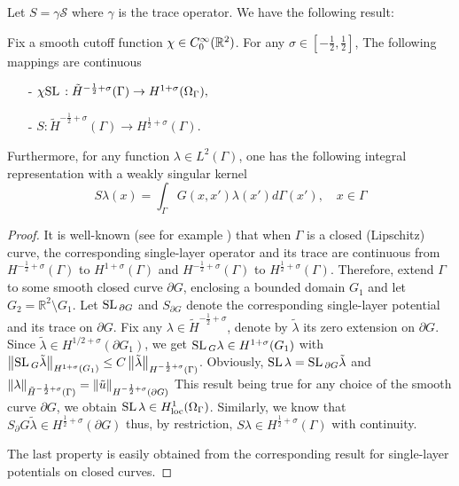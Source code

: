 \documentclass[10pt,a4paper]{article}
\begin{document}
Let $S = \gamma \mathcal S$ where $\gamma$ is the trace operator. We have the following result: 
\begin{The}
	\label{TheoSopenArc}
	Fix a smooth cutoff function $\chi \in C^{\infty}_{0}(\mathbb{R}^2)$. For any $\sigma \in [-\frac{1}{2}, \frac{1}{2}]$, The following mappings are continuous
	\begin{enumerate}
		\item[-] $\chi\mathcal {\textup{SL}\hspace{1.5pt}} : \tilde{H}^{-\frac{1}{2} + \sigma}(\Gamma) \to H^{1+ \sigma}(\Omega_\Gamma),$
		\item[-] $S : \tilde{H}^{-\frac{1}{2} + \sigma}(\Gamma) \to H^{\frac{1}{2}+ \sigma}(\Gamma).$
	\end{enumerate}
	Furthermore, for any function $\lambda \in L^{2}(\Gamma)$, one has the following integral representation with a weakly singular kernel
	\begin{equation}
		S\lambda(x) = \int_{\Gamma} G(x,x') \lambda(x') d\Gamma(x'), \quad x \in \Gamma		
	\end{equation}
	\begin{proof}
		It is well-known (see for example \cite[chap. 6]{mclean2000strongly}) that when $\Gamma$ is a closed (Lipschitz) curve, the corresponding single-layer operator and its trace are continuous from $H^{-\frac{1}{2}+ \sigma}(\Gamma)$ to $H^{1+\sigma}(\Gamma)$ and $H^{-\frac{1}{2}+ \sigma}(\Gamma)$ to $H^{
		\frac{1}{2}+\sigma}(\Gamma)$. Therefore, extend $\Gamma$ to some smooth closed curve $\partial G$, enclosing a bounded domain $G_1$ and let $G_2 = \mathbb{R}^2\setminus G_1$. Let $\textup{SL}\hspace{1.5pt}_{\partial G}$ and $S_{\partial G}$ denote the corresponding single-layer potential and its trace on $\partial G$. Fix any $\lambda \in \tilde{H}^{-\frac{1}{2} + \sigma}$, denote by $\tilde{\lambda}$ its zero extension on $\partial G$. Since $\tilde{\lambda} \in H^{1/2+\sigma}(\partial G_1)$, we get $\textup{SL}\hspace{1.5pt}_G\lambda\in H^{1 + \sigma}(G_1)$ with $\left\|\textup{SL}\hspace{1.5pt}_G \tilde{\lambda}\right\|_{H^{1+\sigma}(G_1)} \leq C \left\|\tilde{\lambda}\right\|_{H^{-\frac{1}{2}+ \sigma}(\Gamma)}$. Obviously, $\textup{SL}\hspace{1.5pt}\lambda = \textup{SL}\hspace{1.5pt}_{\partial G} \tilde{\lambda}$ and $\left\|\lambda\right\|_{\tilde{H}^{-\frac{1}{2}+\sigma}(\Gamma)} = \left\|\tilde{u}\right\|_{H^{-\frac{1}{2} + \sigma}(\partial G)}$ This result being true for any choice of the smooth curve $\partial G$, we obtain $\textup{SL}\hspace{1.5pt}\lambda\in H^{1}_{\text{loc}}(\Omega_\Gamma)$. Similarly, we know that $S_\partial G \tilde{\lambda} \in H^{\frac{1}{2}+\sigma}(\partial G)$ thus, by restriction, $S \lambda \in H^{\frac{1}{2}+\sigma}(\Gamma)$ with continuity. 
	
		The last property is easily obtained from the corresponding result for single-layer potentials on closed curves.  
	\end{proof}
\end{The} 
\end{document}
